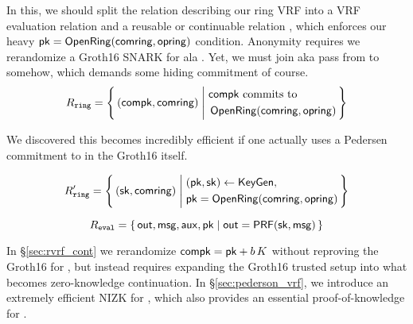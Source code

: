 In this, we should split the relation describing our ring VRF into
a VRF evaluation relation \Reval and a reusable or continuable relation
\Rring, which enforces our heavy $\mathsf{pk} = {\mathsf{OpenRing}}(\mathsf{comring},\mathsf{opring})$
condition.  Anonymity requires we rerandomize a Groth16 SNARK for \Rring
ala \cite[Theorem 3, Appendix C, pp. 31]{RandomizationGroth16}.
%
Yet, we must join aka pass \pk from \Rring to \Reval somehow, which
demands some hiding commitment \compk of course.
%
\def\tmpAA{\textrm{\compk commits to\ }}
\def\tmpBB{\OpenRing(\comring,\openring)}
$$ \Rring = \Setst{ (\compk, \comring) }{
	\eprint{
	\tmpAA \pk = \tmpBB
	}{
    \begin{aligned}
	&\tmpAA \\
	&\, \tmpBB \\
    \end{aligned}
	}
} $$

We discovered this becomes incredibly efficient if one actually uses
a Pedersen commitment to \sk in the Groth16 itself.

$$ \Rring' = \Setst{ (\sk, \comring) }{
    \eprint{
    (\pk,\sk) \leftarrow \KeyGen, \quad %
    \pk = \OpenRing(\comring,\openring) 
    }{
    \begin{aligned}
        &(\pk,\sk) \leftarrow \KeyGen, \\
        &\pk = \OpenRing(\comring,\openring)  \\      
    \end{aligned}
    }
} $$

$$ \Reval = \Setst{ \Out, \msg, \aux, \pk }{ \Out = \PRF(\sk,\msg) } $$

In \S\ref{sec:rvrf_cont} we rerandomize $\mathsf{compk} = \mathsf{pk} + b \, K$
without reproving the Groth16 for \Rring, but instead requires
expanding the Groth16 trusted setup into what becomes zero-knowledge continuation.
%
In \S\ref{sec:pederson_vrf}, we introduce an extremely efficient NIZK
for \Reval, which also provides an essential proof-of-knowledge for \compk.


\endinput





Ring VRFs are firstly ring signatures broadly interpreted, in that they
prove an involved public key lies inside some commitment \comring to
the plausible signer set, known as the ring.
Anyone could compute \comring from this set of public keys.
%
At the same time, ring VRFs prove correct output of a PRF keyed by
the signer's actual secret key, and evaluated on a supplied message \msg,
which then links ring VRF signatures on the same \msg.

\smallskip
